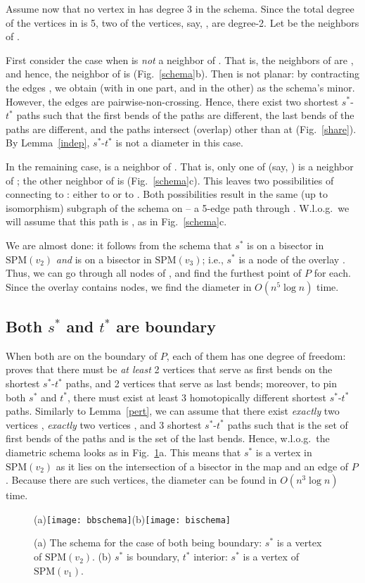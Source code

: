 \documentclass{llncs}
\newif\ifim \imtrue
\newcommand{\e}[1]{\emph{#1}}
\renewcommand\-{\textrm{-}}
\renewcommand{\O}[1]{\ensuremath{O(#1 \log n)}\xspace}
\renewcommand\P{\ensuremath{P}\xspace}
\newcommand{\spm}[1]{\ensuremath{\textrm{SPM}(#1)}\xspace}
\renewcommand\ss{\ensuremath{s^*}\xspace}
\renewcommand\tt{\ensuremath{t^*}\xspace}
\begin{document}
Assume now that no vertex in  has degree 3 in the schema. Since the total degree of the vertices in  is 5, two of the vertices, say, , are degree-2. Let  be the neighbors of .

First consider the case when  is \e{not} a neighbor of . That is, the
neighbors of  are , and hence, the neighbor of  is 
(Fig.~\ref{schema}b). Then  is not planar: by contracting the edges , we obtain  (with  in one part, and
 in the other) as the schema's minor. However, the edges
 are
pairwise-non-crossing. Hence, there exist two shortest \ss-\tt paths such that
the first bends of the paths are different, the last bends of the paths are
different, and the paths intersect (overlap) other than at 
(Fig.~\ref{share}). By Lemma~\ref{indep}, \ss-\tt is not a diameter in this
case.





In the remaining case,  is a neighbor of . That is, only one of  (say, ) is a neighbor of ; the other neighbor of  is  (Fig.~\ref{schema}c). This leaves two possibilities of connecting  to : either to  or to . Both possibilities result in the same (up to isomorphism) subgraph of the schema on  -- a 5-edge path through . W.l.o.g.\ we will assume that this path is , as in Fig.~\ref{schema}c.

We are almost done: it follows from the schema that \ss is on a bisector in
\spm{v_2} \e{and} is on a bisector in \spm{v_3}; i.e., \ss is a node of the
overlay . Thus, we can go through all nodes of , and find the
furthest point of \P for each. Since the overlay contains  nodes, we find
the diameter in \O{n^5} time.

\subsection{Both \ss and \tt are boundary}
When both  are on the boundary of \P, each of them has one degree of freedom: \cite[Theorem~2]{bae} proves that there must be \e{at least} 2 vertices that serve as first bends on the shortest \ss-\tt paths, and 2 vertices that serve as last bends; moreover, to pin both \ss and \tt, there must exist at least 3 homotopically different shortest \ss-\tt paths. Similarly to Lemma~\ref{pert}, we can assume that there exist \e{exactly} two vertices , \e{exactly} two vertices , and 3 shortest \ss-\tt paths such that  is the set of first bends of the paths and  is the set of the last bends. Hence, w.l.o.g.\ the diametric schema looks as in Fig.~\ref{bd}a. This means that \ss is a vertex in \spm{v_2} as it lies on the intersection of a bisector in the map and an edge of \P. Because there are  such vertices, the diameter can be found in \O{n^3} time.
\begin{figure}\centering
\ifim (a)\texttt{[image: bbschema]}\hfil(b)\texttt{[image: bischema]} \fi
\caption{(a) The schema for the case of both  being boundary: \ss is a vertex of \spm{v_2}. (b) \ss is boundary, \tt interior: \ss is a vertex of \spm{v_1}.}
\label{bd}\end{figure}
\end{document}
